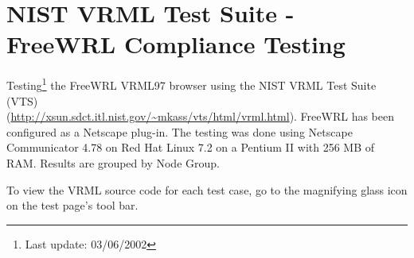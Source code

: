 \documentclass[12pt,letterpaper]{article}
\begin{document}
\part*{NIST VRML Test Suite - FreeWRL Compliance Testing}

Testing\footnote{\textcolor{cranberry}{Last update: 03/06/2002}}
the FreeWRL VRML97 browser using the NIST VRML Test Suite (VTS)\\
(\url{http://xsun.sdct.itl.nist.gov/~mkass/vts/html/vrml.html}).
FreeWRL has been configured as a Netscape plug-in.
The testing was done using Netscape Communicator 4.78 on Red Hat Linux 7.2
on a Pentium II with 256 MB of RAM.
Results are grouped by Node Group.

To view the VRML source code for each test case, go to the magnifying glass
icon on the test page's tool bar.












\end{document}
